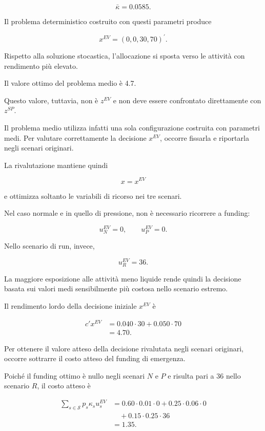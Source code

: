 \[
\bar\kappa
=
0.0585.
\]

Il problema deterministico costruito con questi parametri produce

\[
x^{EV}
=
(0,0,30,70)^{\prime}.
\]

Rispetto alla soluzione stocastica, l'allocazione si sposta verso le
attivit\`a con rendimento pi\`u elevato.

Il valore ottimo del problema medio \`e 4.7.

Questo valore, tuttavia, non \`e \(z^{EV}\) e non deve essere confrontato
direttamente con \(z^{SP}\).

Il problema medio utilizza infatti una sola configurazione costruita con
parametri medi. Per valutare correttamente la decisione \(x^{EV}\), occorre
fissarla e riportarla negli scenari originari.

La rivalutazione mantiene quindi

\[
x=x^{EV}
\]

\noindent e ottimizza soltanto le variabili di ricorso nei tre scenari.

Nel caso normale e in quello di pressione, non \`e necessario ricorrere a
funding:

\[
u_N^{EV}=0,
\qquad
u_P^{EV}=0.
\]

Nello scenario di run, invece,

\[
u_R^{EV}=36.
\]

La maggiore esposizione alle attivit\`a meno liquide rende quindi la
decisione basata sui valori medi sensibilmente pi\`u costosa nello scenario
estremo.


Il rendimento lordo della decisione
iniziale $x^{EV}$ \`{e}

\[
\begin{aligned}
c'x^{EV}
&=
0.040\cdot 30
+
0.050\cdot 70
\\
&=
4.70.
\end{aligned}
\]

Per ottenere il valore atteso della decisione
rivalutata negli scenari originari,
occorre sottrarre il costo atteso
del funding di emergenza.

Poich\'{e} il funding ottimo
\`{e} nullo negli scenari $N$ e $P$
e risulta pari a $36$ nello scenario $R$,
il costo atteso \`{e}

\[
\begin{aligned}
\sum_{s\in\mathcal S}
p_s\kappa_su_s^{EV}
&=
0.60\cdot0.01\cdot0
+
0.25\cdot0.06\cdot0
\\
&\quad+
0.15\cdot0.25\cdot36
\\
&=
1.35.
\end{aligned}
\]

